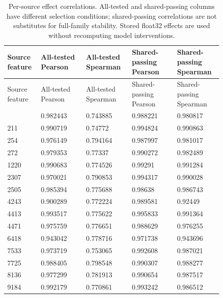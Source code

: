 \begin{longtable}{@{}L{0.11\linewidth}L{0.19\linewidth}L{0.19\linewidth}L{0.19\linewidth}L{0.19\linewidth}@{}}
\caption{Per-source effect correlations. All-tested and shared-passing columns have different selection conditions; shared-passing correlations are not substitutes for full-family stability. Stored float32 effects are used without recomputing model interventions.}\\
\toprule
Source feature & All-tested Pearson & All-tested Spearman & Shared-passing Pearson & Shared-passing Spearman \\
\midrule
\endfirsthead
\toprule
Source feature & All-tested Pearson & All-tested Spearman & Shared-passing Pearson & Shared-passing Spearman \\
\midrule
\endhead
\endfoot
\bottomrule
{} & 0.982443 & 0.743885 & 0.988221 & 0.980817 \\
211 & 0.990719 & 0.74772 & 0.994824 & 0.990863 \\
254 & 0.976149 & 0.794164 & 0.987997 & 0.981017 \\
272 & 0.979353 & 0.77337 & 0.990272 & 0.982489 \\
1220 & 0.990683 & 0.774526 & 0.99291 & 0.991284 \\
2307 & 0.970021 & 0.790853 & 0.994317 & 0.990028 \\
2505 & 0.985394 & 0.775688 & 0.98638 & 0.986743 \\
4243 & 0.900289 & 0.772224 & 0.989581 & 0.92449 \\
4413 & 0.993517 & 0.775622 & 0.995833 & 0.991364 \\
4471 & 0.975759 & 0.776651 & 0.988629 & 0.976255 \\
6418 & 0.943042 & 0.778716 & 0.971738 & 0.943696 \\
7533 & 0.973719 & 0.753065 & 0.992608 & 0.987021 \\
7725 & 0.988405 & 0.798548 & 0.990307 & 0.988277 \\
8136 & 0.977299 & 0.781913 & 0.990654 & 0.987517 \\
9184 & 0.992179 & 0.770861 & 0.993242 & 0.986512 \\
\end{longtable}
